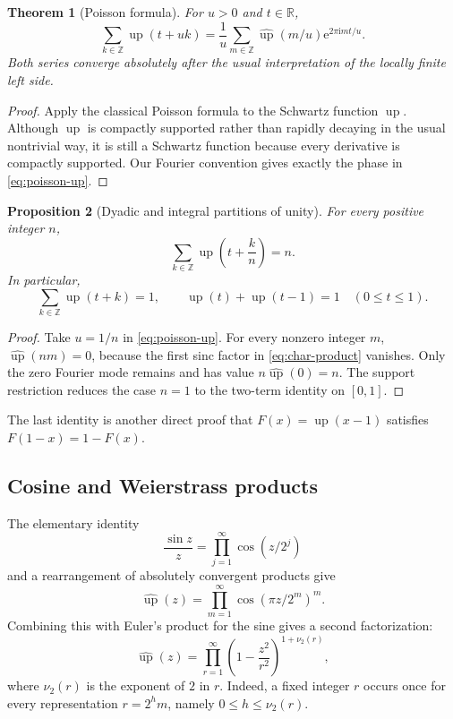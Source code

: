 \documentclass[11pt]{article}
\numberwithin{equation}{section}
\newtheorem{theorem}{Theorem}[section]
\newtheorem{proposition}[theorem]{Proposition}
\theoremstyle{definition}
\theoremstyle{remark}
\newcommand{\R}{\mathbb{R}}
\newcommand{\Z}{\mathbb{Z}}
\newcommand{\e}{\mathrm{e}}
\newcommand{\ii}{\mathrm{i}}
\newcommand{\upf}{\operatorname{up}}
\begin{document}
\begin{theorem}[Poisson formula]\label{thm:poisson-up}
For $u>0$ and $t\in\R$,
\begin{equation}\label{eq:poisson-up}
 \sum_{k\in\Z}\upf(t+uk)
 =\frac1u\sum_{m\in\Z}
   \widehat{\upf}(m/u)\e^{2\pi\ii mt/u}.
\end{equation}
Both series converge absolutely after the usual interpretation of the
locally finite left side.
\end{theorem}

\begin{proof}
Apply the classical Poisson formula to the Schwartz function $\upf$.  Although
$\upf$ is compactly supported rather than rapidly decaying in the usual
nontrivial way, it is still a Schwartz function because every derivative is
compactly supported.  Our Fourier convention gives exactly the phase in
\eqref{eq:poisson-up}.
\end{proof}

\begin{proposition}[Dyadic and integral partitions of unity]
\label{prop:partition-unity}
For every positive integer $n$,
\begin{equation}\label{eq:fine-partition}
 \sum_{k\in\Z}\upf\left(t+\frac{k}{n}\right)=n.
\end{equation}
In particular,
\begin{equation}\label{eq:unit-partition}
 \sum_{k\in\Z}\upf(t+k)=1,
 \qquad
 \upf(t)+\upf(t-1)=1\quad(0\le t\le1).
\end{equation}
\end{proposition}

\begin{proof}
Take $u=1/n$ in \eqref{eq:poisson-up}.  For every nonzero integer $m$,
$\widehat{\upf}(nm)=0$, because the first sinc factor in
\eqref{eq:char-product} vanishes.  Only the zero Fourier mode remains and has
value $n\widehat{\upf}(0)=n$.  The support restriction reduces the case $n=1$
to the two-term identity on $[0,1]$.
\end{proof}

The last identity is another direct proof that
$F(x)=\upf(x-1)$ satisfies $F(1-x)=1-F(x)$.

\subsection{Cosine and Weierstrass products}

The elementary identity
\[
 \frac{\sin z}{z}=\prod_{j=1}^{\infty}\cos(z/2^j)
\]
and a rearrangement of absolutely convergent products give
\begin{equation}\label{eq:cos-product}
 \widehat{\upf}(z)
 =\prod_{m=1}^{\infty}\cos(\pi z/2^m)^m.
\end{equation}
Combining this with Euler's product for the sine gives a second factorization:
\begin{equation}\label{eq:weierstrass-product}
 \widehat{\upf}(z)
 =\prod_{r=1}^{\infty}
   \left(1-\frac{z^2}{r^2}\right)^{1+\nu_2(r)},
\end{equation}
where $\nu_2(r)$ is the exponent of $2$ in $r$.  Indeed, a fixed integer
$r$ occurs once for every representation $r=2^h m$, namely
$0\le h\le\nu_2(r)$.
\end{document}

